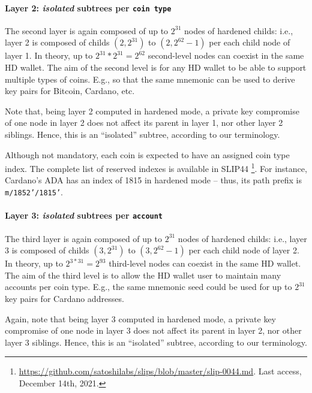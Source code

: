 \paragraph{Layer 2: \emph{isolated} subtrees per \texttt{coin type}} %
The second layer is again composed of up to $2^{31}$ nodes of hardened childs:
i.e., layer 2 is composed of childs $(2,2^{31})$ to $(2,2^{62}-1)$ per each child
node of layer 1. In theory, up to $2^{31}*2^{31}=2^{62}$ second-level nodes can
coexist in the same HD wallet. The aim of the second level is for any HD wallet
to be able to support multiple types of coins. E.g., so that the same mnemonic
can be used to derive key pairs for Bitcoin, Cardano, etc.

Note that, being layer 2 computed in hardened mode, a private key compromise
of one node in layer 2 does not affect its parent in layer 1, nor other layer 2
siblings. Hence, this is an ``isolated'' subtree, according to our terminology.

Although not mandatory, each coin is expected to have an assigned coin type
index. The complete list of reserved indexes is available in SLIP44%
\footnote{\url{https://github.com/satoshilabs/slips/blob/master/slip-0044.md}.
  Last access, December 14th, 2021.}. For instance, Cardano's ADA has an index
of 1815 in hardened mode -- thus, its path prefix is \texttt{m/1852'/1815'}.

\paragraph{Layer 3: \emph{isolated} subtrees per \texttt{account}} %
The third layer is again composed of up to $2^{31}$ nodes of hardened childs:
i.e., layer 3 is composed of childs $(3,2^{31})$ to $(3,2^{62}-1)$ per each child
node of layer 2. In theory, up to $2^{3*31}=2^{93}$ third-level nodes can
coexist in the same HD wallet. The aim of the third level is to allow the HD
wallet user to maintain many accounts per coin type. E.g., the same mnemonic
seed could be used for up to $2^{31}$ key pairs for Cardano addresses.

Again, note that being layer 3 computed in hardened mode, a private key compromise
of one node in layer 3 does not affect its parent in layer 2, nor other layer 3
siblings. Hence, this is an ``isolated'' subtree, according to our terminology.

